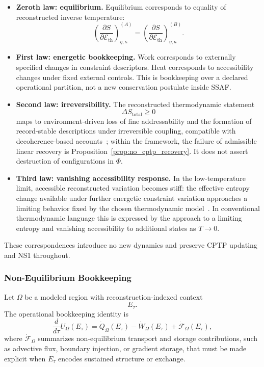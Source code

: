 \documentclass[aps,prx,onecolumn,11pt]{revtex4-2}
\theoremstyle{plain}
\theoremstyle{definition}
\theoremstyle{remark}
\begin{document}
\begin{itemize}[leftmargin=*]

\item \textbf{Zeroth law: equilibrium.}
Equilibrium corresponds to equality of reconstructed inverse
temperature:
\[
\left(
\frac{\partial S}{\partial \mathcal{E}_{\mathrm{th}}}
\right)^{(A)}_{\eta,\kappa}
=
\left(
\frac{\partial S}{\partial \mathcal{E}_{\mathrm{th}}}
\right)^{(B)}_{\eta,\kappa}.
\]

\item \textbf{First law: energetic bookkeeping.}
Work corresponds to externally specified changes in constraint
descriptors. Heat corresponds to accessibility changes under fixed
external controls. This is bookkeeping over a declared operational
partition, not a new conservation postulate inside SSAF.

\item \textbf{Second law: irreversibility.}
The reconstructed thermodynamic statement
\[
\Delta S_{\mathrm{total}}\geq 0
\]
maps to environment-driven loss of fine addressability and the formation
of record-stable descriptions under irreversible coupling, compatible
with decoherence-based accounts~\cite{Zurek2003,BreuerPetruccione2002};
within the framework, the failure of admissible linear recovery is
Proposition~\ref{prop:no_cptp_recovery}.
It does not assert destruction of configurations in \(\Phi\).

\item \textbf{Third law: vanishing accessibility response.}
In the low-temperature limit, accessible reconstructed variation becomes
stiff: the effective entropy change available under further energetic
constraint variation approaches a limiting behavior fixed by the chosen
thermodynamic model~\cite{Callen1985}. In conventional thermodynamic
language this is expressed by the approach to a limiting entropy and
vanishing accessibility to additional states as \(T\to 0\).

\end{itemize}

These correspondences introduce no new dynamics and preserve CPTP
updating and NS1 throughout.

\subsubsection{Non-Equilibrium Bookkeeping}
\label{app:neq_first_law_bookkeeping}

Let \(\Omega\) be a modeled region with reconstruction-indexed context
\[
E_\tau.
\]
The operational bookkeeping identity is
\begin{equation}
\frac{d}{d\tau}
U_\Omega(E_\tau)
=
\dot{Q}_\Omega(E_\tau)
-
\dot{W}_\Omega(E_\tau)
+
\dot{\mathcal{F}}_\Omega(E_\tau),
\label{eq:neq_first_law_flux_term}
\end{equation}
where \(\dot{\mathcal{F}}_\Omega\) summarizes non-equilibrium transport
and storage contributions, such as advective flux, boundary injection,
or gradient storage, that must be made explicit when \(E_\tau\) encodes
sustained structure or exchange.
\end{document}

